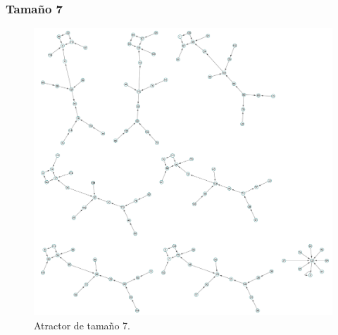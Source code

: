 \documentclass[11pt]{article}
\begin{document}
			\subsubsection{Tamaño 7}
			\begin{figure}[H]
			\centering
			\includegraphics[scale=0.1]{resources/Atractores54/atractor_54_size_7.png}
			\caption{Atractor de tamaño 7.}\label{fig:picture}
			\end{figure}
\end{document}
